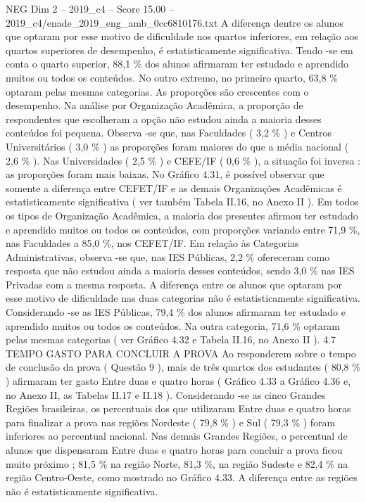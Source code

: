 \begin{textsample}{NEG Dim 2 – 2019\_c4 – Score 15.00 – 2019\_c4/enade\_2019\_eng\_amb\_0cc6810176.txt}
A diferença dentre os alunos que optaram por esse motivo de dificuldade nos quartos inferiores, em relação aos quartos superiores de desempenho, é estatisticamente significativa.
Tendo -se em conta o quarto superior, 88,1 \% dos alunos afirmaram ter estudado e aprendido muitos ou todos os conteúdos.
No outro extremo, no primeiro quarto, 63,8 \% optaram pelas mesmas categorias.
As proporções são crescentes com o desempenho.
Na análise por Organização Acadêmica, a proporção de respondentes que escolheram a opção não estudou ainda a maioria desses conteúdos foi pequena.
Observa -se que, nas Faculdades ( 3,2 \% ) e Centros Universitários ( 3,0 \% ) as proporções foram maiores do que a média nacional ( 2,6 \% ).
Nas Universidades ( 2,5 \% ) e CEFE/IF ( 0,6 \% ), a situação foi inversa : as proporções foram mais baixas.
No Gráfico 4.31, é possível observar que somente a diferença entre CEFET/IF e as demais Organizações Acadêmicas é estatisticamente significativa ( ver também Tabela II.16, no Anexo II ).
Em todos os tipos de Organização Acadêmica, a maioria dos presentes afirmou ter estudado e aprendido muitos ou todos os conteúdos, com proporções variando entre 71,9 \%, nas Faculdades a 85,0 \%, nos CEFET/IF.
Em relação às Categorias Administrativas, observa -se que, nas IES Públicas, 2,2 \% ofereceram como resposta que não estudou ainda a maioria desses conteúdos, sendo 3,0 \% nas IES Privadas com a mesma resposta.
A diferença entre os alunos que optaram por esse motivo de dificuldade nas duas categorias não é estatisticamente significativa.
Considerando -se as IES Públicas, 79,4 \% dos alunos afirmaram ter estudado e aprendido muitos ou todos os conteúdos.
Na outra categoria, 71,6 \% optaram pelas mesmas categorias ( ver Gráfico 4.32 e Tabela II.16, no Anexo II ). 4.7 TEMPO GASTO PARA CONCLUIR A PROVA Ao responderem sobre o tempo de conclusão da prova ( Questão 9 ), mais de três quartos dos estudantes ( 80,8 \% ) afirmaram ter gasto Entre duas e quatro horas ( Gráfico 4.33 a Gráfico 4.36 e, no Anexo II, as Tabelas II.17 e II.18 ).
Considerando -se as cinco Grandes Regiões brasileiras, os percentuais dos que utilizaram Entre duas e quatro horas para finalizar a prova nas regiões Nordeste ( 79,8 \% ) e Sul ( 79,3 \% ) foram inferiores ao percentual nacional.
Nas demais Grandes Regiões, o percentual de alunos que dispensaram Entre duas e quatro horas para concluir a prova ficou muito próximo ; 81,5 \% na região Norte, 81,3 \%, na região Sudeste e 82,4 \% na região Centro-Oeste, como mostrado no Gráfico 4.33.
A diferença entre as regiões não é estatisticamente significativa.

\end{textsample}
